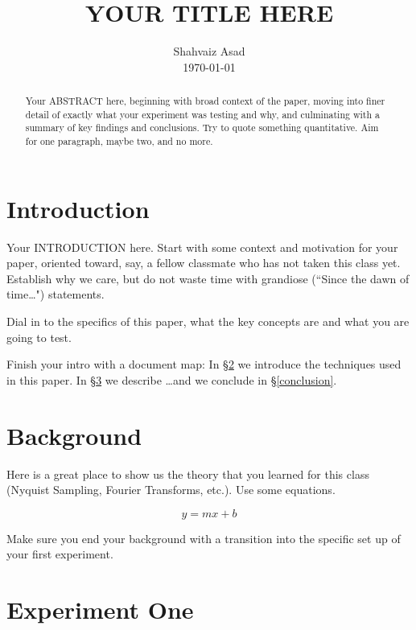 \documentclass[12pt,preprint]{aastex}
\begin{document}
\title{YOUR TITLE HERE}

\author{Shahvaiz Asad \\ \today}

\begin{abstract}
Your ABSTRACT here, beginning with broad context of the paper,
moving into finer detail of exactly what your experiment was
testing and why, and culminating with a summary of key findings
and conclusions. Try to quote something quantitative. Aim for
one paragraph, maybe two, and no more.
\end{abstract}


\section{Introduction}
\label{intro} %

Your INTRODUCTION here. Start with some context and motivation for
your paper, oriented toward, say, a fellow classmate who has not
taken this class yet. Establish why we care, but do not waste time
with grandiose (``Since the dawn of time\dots") statements.

Dial in to the specifics of this paper, what the key concepts are
and what you are going to test.

Finish your intro with a document map: In \S\ref{background} we 
introduce the techniques used in this paper. In \S\ref{experiment1}
we describe \dots and we conclude in 
\S\ref{conclusion}.

\section{Background}
\label{background}

Here is a great place to show us the theory that you learned for
this class (Nyquist Sampling, Fourier Transforms, etc.). Use some
equations.

\begin{equation}
y=mx+b
\label{eq:example}
\end{equation}

Make sure you end your background with a transition into the specific
set up of your first experiment.

\section{Experiment One}
\label{experiment1}
\end{document}
